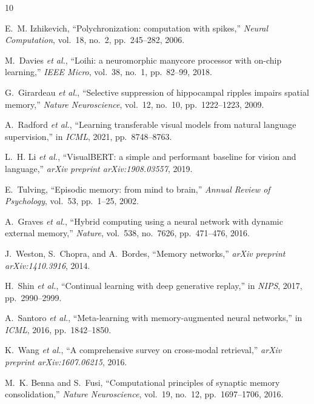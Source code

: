 \begin{thebibliography}{10}

E.~M. Izhikevich, ``Polychronization: computation with spikes,'' \textit{Neural Computation}, vol.~18, no.~2, pp.~245--282, 2006.

M.~Davies \textit{et al.}, ``Loihi: a neuromorphic manycore processor with on-chip learning,'' \textit{IEEE Micro}, vol.~38, no.~1, pp.~82--99, 2018.

G.~Girardeau \textit{et al.}, ``Selective suppression of hippocampal ripples impairs spatial memory,'' \textit{Nature Neuroscience}, vol.~12, no.~10, pp.~1222--1223, 2009.

A.~Radford \textit{et al.}, ``Learning transferable visual models from natural language supervision,'' in \textit{ICML}, 2021, pp.~8748--8763.

L.~H. Li \textit{et al.}, ``VisualBERT: a simple and performant baseline for vision and language,'' \textit{arXiv preprint arXiv:1908.03557}, 2019.

E.~Tulving, ``Episodic memory: from mind to brain,'' \textit{Annual Review of Psychology}, vol.~53, pp.~1--25, 2002.

A.~Graves \textit{et al.}, ``Hybrid computing using a neural network with dynamic external memory,'' \textit{Nature}, vol.~538, no.~7626, pp.~471--476, 2016.

J.~Weston, S.~Chopra, and A.~Bordes, ``Memory networks,'' \textit{arXiv preprint arXiv:1410.3916}, 2014.

H.~Shin \textit{et al.}, ``Continual learning with deep generative replay,'' in \textit{NIPS}, 2017, pp.~2990--2999.

A.~Santoro \textit{et al.}, ``Meta-learning with memory-augmented neural networks,'' in \textit{ICML}, 2016, pp.~1842--1850.

K.~Wang \textit{et al.}, ``A comprehensive survey on cross-modal retrieval,'' \textit{arXiv preprint arXiv:1607.06215}, 2016.

M.~K. Benna and S.~Fusi, ``Computational principles of synaptic memory consolidation,'' \textit{Nature Neuroscience}, vol.~19, no.~12, pp.~1697--1706, 2016.


\end{thebibliography}
